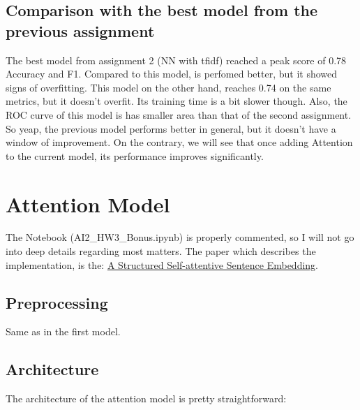 \documentclass[12pt]{report}
\begin{document}
\subsection*{Comparison with the best model from the previous assignment}
The best model from assignment 2 (NN with tfidf) reached a peak score of 0.78 Accuracy and F1.
Compared to this model, is perfomed better, but it showed signs of overfitting. This model on
the other hand, reaches 0.74 on the same metrics, but it doesn't overfit. Its training time
is a bit slower though. Also, the ROC curve of this model is has smaller area than that of
the second assignment. So yeap, the previous model performs better in general, but it
doesn't have a window of improvement. On the contrary, we will see that once adding
Attention to the current model, its performance improves significantly.


\clearpage
\section*{Attention Model}
The Notebook (AI2\_HW3\_Bonus.ipynb) is properly commented, so I will not go into deep
details regarding most matters. The paper which describes the implementation, is
the: \href{https://arxiv.org/abs/1703.03130}{A Structured Self-attentive Sentence Embedding}.
\bigskip

\subsection*{Preprocessing}
Same as in the first model.
\bigskip

\subsection*{Architecture}
The architecture of the attention model is pretty straightforward:
\end{document}
